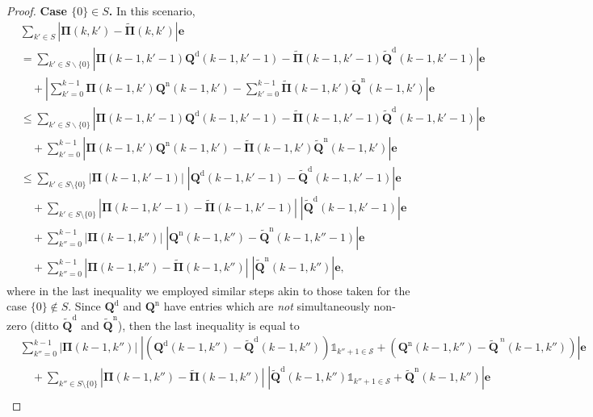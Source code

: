 \documentclass[11pt,leqno]{amsart}
\numberwithin{table}{section}
\numberwithin{figure}{section}
\numberwithin{equation}{section}
\newcommand{\1}{{\mathds{1}}}
\newcommand{\0}{\mat{0}}
\newcommand{\tld}[1]{\widetilde{#1}}
\begin{document}
{\begin{proof}
\textbf{Case $\{0\}\in S$.} In this scenario,
\begin{align*}
&\sum_{k'\in S} \left|{\bm{\Pi}}(k,k')-\tld{\bm{\Pi}}(k,k')\right|\bm{e}\\
&=\sum_{k'\in S\backslash\{0\}}  \left|{\bm{\Pi}}(k-1,k'-1){\bm{Q}}^{\mathrm{d}}(k-1,k'-1) -  \tld{\bm{\Pi}}(k-1,k'-1)\tld{\bm{Q}}^{\mathrm{d}}(k-1,k'-1)\right|\bm{e}\\
&\quad + \left|\sum_{k'=0}^{k-1}  {\bm{\Pi}}(k-1,k'){\bm{Q}}^{\mathrm{n}}(k-1,k')-\sum_{k'=0}^{k-1}  \tld{\bm{\Pi}}(k-1,k')\tld{\bm{Q}}^{\mathrm{n}}(k-1,k')\right|\bm{e}\\
&\le\sum_{k'\in S\backslash\{0\}}  \left|{\bm{\Pi}}(k-1,k'-1){\bm{Q}}^{\mathrm{d}}(k-1,k'-1) -  \tld{\bm{\Pi}}(k-1,k'-1)\tld{\bm{Q}}^{\mathrm{d}}(k-1,k'-1)\right|\bm{e}\\
&\quad + \sum_{k'=0}^{k-1} \left|  {\bm{\Pi}}(k-1,k'){\bm{Q}}^{\mathrm{n}}(k-1,k')-\tld{\bm{\Pi}}(k-1,k')\tld{\bm{Q}}^{\mathrm{n}}(k-1,k')\right|\bm{e}\\
&\le\sum_{k'\in S\setminus\{0\}}\left|  {\bm{\Pi}}(k-1,k'-1)\right|\;\left| {\bm{Q}}^{\mathrm{d}}(k-1,k'-1)-\tld{\bm{Q}}^{\mathrm{d}}(k-1,k'-1)\right|\bm{e}\\
&\quad + \sum_{k'\in S\setminus\{0\}}\left| {\bm{\Pi}}(k-1,k'-1)-\tld{\bm{\Pi}}(k-1,k'-1)\right|\;\left|\tld{\bm{Q}}^{\mathrm{d}}(k-1,k'-1)\right|\bm{e}\\
&\quad+\sum_{k''=0}^{k-1}\left|  {\bm{\Pi}}(k-1,k'')\right|\;\left| {\bm{Q}}^{\mathrm{n}}(k-1,k'')-\tld{\bm{Q}}^{\mathrm{n}}(k-1,k''-1)\right|\bm{e}\\
&\quad + \sum_{k''=0}^{k-1}\left| {\bm{\Pi}}(k-1,k'')-\tld{\bm{\Pi}}(k-1,k'')\right|\;\left|\tld{\bm{Q}}^{\mathrm{n}}(k-1,k'')\right|\bm{e},
\end{align*}
where in the last inequality we employed similar steps akin to those taken for the case $\{0\}\notin S$. Since ${\bm{Q}}^{\mathrm{d}}$ and ${\bm{Q}}^{\mathrm{n}}$ have entries which are \emph{not} simultaneously non-zero (ditto $\tld{\bm{Q}}^{\mathrm{d}}$ and $\tld{\bm{Q}}^{\mathrm{n}}$), then the last inequality is equal to
\begin{align}
&\sum_{k''=0}^{k-1}\left|  {\bm{\Pi}}(k-1,k'')\right|\;\left| \left({\bm{Q}}^{\mathrm{d}}(k-1,k'')-\tld{\bm{Q}}^{\mathrm{d}}(k-1,k'')\right)\mathds{1}_{k''+1\in \mathcal{S}} + \left({\bm{Q}}^{\mathrm{n}}(k-1,k'')-\tld{\bm{Q}}^{\ {n}}(k-1,k'')\right)\right|\bm{e}\nonumber\\
&\quad + \sum_{k''\in S\setminus\{0\}}\left| {\bm{\Pi}}(k-1,k'')-\tld{\bm{\Pi}}(k-1,k'')\right|\;\left|\tld{\bm{Q}}^{\mathrm{d}}(k-1,k'')\mathds{1}_{k''+1\in \mathcal{S}} + \tld{\bm{Q}}^{\mathrm{n}}(k-1,k'')\right|\bm{e}\nonumber\\

\end{align}
\end{proof}}
\end{document}
